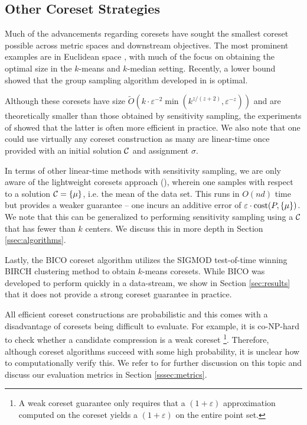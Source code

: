 

\subsection{Other Coreset Strategies}
\label{ssec:clustering_prelim}

Much of the advancements regarding coresets have sought the smallest coreset possible across metric spaces and downstream objectives. The most prominent
examples are in Euclidean space \cite{BadoiuHI02, HaM04, Chen09, HuangV20, stoc22}, with much of the focus on obtaining the optimal size in the $k$-means and
$k$-median setting. Recently, a lower bound \cite{huangLB} showed that the group sampling algorithm developed in \cite{stoc21, stoc22} is optimal.

Although these coresets have size $\tilde{O}(k\cdot \varepsilon^{-2} \min(k^{z/(z+2)},\varepsilon^{-z}))$ \cite{CLSSS22} and are theoretically smaller than
those obtained by sensitivity sampling, the experiments of \cite{chrisESA} showed that the latter is often more efficient in practice. We also note that one
could use virtually any coreset construction as many are linear-time once provided with an initial solution $\mathcal C$ and assignment $\sigma$.

In terms of other linear-time methods with sensitivity sampling, we are only aware of the lightweight coresets approach (\cite{BachemL018}), wherein one
samples with respect to a solution $\mathcal C=\{\mu\}$, i.e. the mean of the data set. This runs in $O(nd)$ time but provides a weaker guarantee -- one incurs an
additive error of $\varepsilon\cdot \operatorname{cost}(P,\{\mu\})$.  We note that this can be generalized to performing sensitivity sampling using a $\mathcal C$ that has fewer
than $k$ centers. We discuss this in more depth in Section \ref{ssec:algorithms}.

Lastly, the BICO coreset algorithm \cite{bico} utilizes the SIGMOD test-of-time winning BIRCH \cite{birch} clustering method to obtain $k$-means coresets. While
BICO was developed to perform quickly in a data-stream, we show in Section \ref{sec:results} that it does not provide a strong coreset guarantee in
practice.

All efficient coreset constructions are probabilistic and this comes with a disadvantage of coresets being difficult to evaluate. For example, it is co-NP-hard
to check whether a candidate compression is a weak coreset \cite{chrisESA}\footnote{A weak coreset guarantee only requires that a $(1+\varepsilon)$ approximation computed on
the coreset yields a $(1+\varepsilon)$ on the entire point set.}. Therefore, although coreset algorithms succeed with some high probability, it
is unclear how to computationally verify this. We refer to \cite{chrisESA} for further discussion on this topic and discuss our evaluation metrics in Section
\ref{sssec:metrics}.

